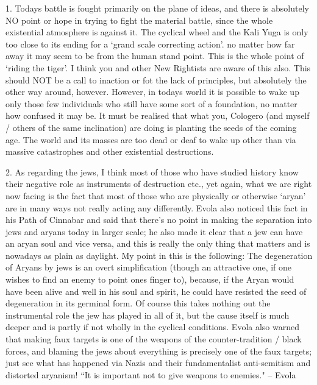 \begin{footnotesize}
\begin{sffamily}
1. Todays battle is fought primarily on the plane of ideas, and there is absolutely NO point or hope in trying to fight the material battle, since the whole existential atmosphere is against it. The cyclical wheel and the Kali Yuga is only too close to its ending for a `grand scale correcting action'. no matter how far away it may seem to be from the human stand point. This is the whole point of `riding the tiger'. I think you and other New Rightists are aware of this also. This should NOT be a call to inaction or fot the lack of principles, but absolutely the other way around, however. However, in todays world it is possible to wake up only those few individuals who still have some sort of a foundation, no matter how confused it may be. It must be realised that what you, Cologero (and myself / others of the same inclination) are doing is planting the seeds of the coming age. The world and its masses are too dead or deaf to wake up other than via massive catastrophes and other existential destructions.

2. As regarding the jews, I think most of those who have studied history know their negative role as instruments of destruction etc., yet again, what we are right now facing is the fact that most of those who are physically or otherwise `aryan' are in many ways not really acting any differently. Evola also noticed this fact in his Path of Cinnabar and said that there's no point in making the separation into jews and aryans today in larger scale; he also made it clear that a jew can have an aryan soul and vice versa, and this is really the only thing that matters and is nowadays as plain as daylight. My point in this is the following: The degeneration of Aryans by jews is an overt simplification (though an attractive one, if one wishes to find an enemy to point ones finger to), because, if the Aryan would have been alive and well in his soul and spirit, he could have resisted the seed of degeneration in its germinal form. Of course this takes nothing out the instrumental role the jew has played in all of it, but the cause itself is much deeper and is partly if not wholly in the cyclical conditions. Evola also warned that making faux targets is one of the weapons of the counter-tradition / black forces, and blaming the jews about everything is precisely one of the faux targets; just see what has happened via Nazis and their fundamentalist anti-semitism and distorted aryanism! ``It is important not to give weapons to enemies." – Evola


\end{sffamily}
\end{footnotesize}
